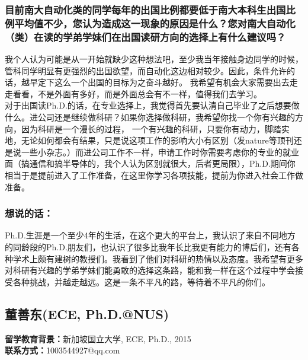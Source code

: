\documentclass[a4paper,UTF8]{book}
\begin{document}
    \subsubsection*{目前南大自动化类的同学每年的出国比例都要低于南大本科生出国比例平均值不少，您认为造成这一现象的原因是什么？您对南大自动化（类）在读的学弟学妹们在出国读研方向的选择上有什么建议吗？}
    我个人认为可能是从一开始就缺少这种想法吧，至少我当年接触身边同学的时候，管科同学明显有更强烈的出国欲望，而自动化这边相对较少。因此，条件允许的话，越早定下这么一个出国的目标为之奋斗越好。 我希望有机会大家需要出去走走看看，不是外面有多好，而是外面总会有不一样，值得我们去学习。\\
    对于出国读Ph.D.的话，在专业选择上，我觉得首先要认清自己毕业了之后想要做什么。进公司还是继续做科研？如果你选择做科研，我希望你找一个你有兴趣的方向，因为科研是一个漫长的过程， 一个有兴趣的科研，只要你有动力，脚踏实地，无论如何都会有结果，只是说这项工作的影响大小有区别（发nature等顶刊还是说一些小杂志。）而进公司工作不一样，申请工作时你需要考虑你的专业的就业面（搞通信和搞半导体的，我个人认为区别就很大，后者更局限），Ph.D.期间你相当于是提前进入了工作准备，在这里你学习各项技能，提前为你进入社会工作做准备。
                    
    \subsubsection{想说的话：}
    Ph.D.生涯是一个至少4年的生活，在这个更大的平台上，我认识了来自不同地方的同龄段的Ph.D.朋友们，也认识了很多比我年长比我更有能力的博后们，还有各种学术上颇有建树的教授们。我看到了他们对科研的热情以及态度。我希望有更多对科研有兴趣的学弟学妹们能勇敢的选择这条路，能和我一样在这个过程中学会接受各种挑战，并越走越远。这是一条不平凡的路，等待着不平凡的你们。


\clearpage
\subsection{董善东(ECE, Ph.D.@NUS)}
    \textbf{留学教育背景：}新加坡国立大学, ECE, Ph.D., 2015 \\
    \textbf{联系方式：}1003544927@qq.com
\end{document}
